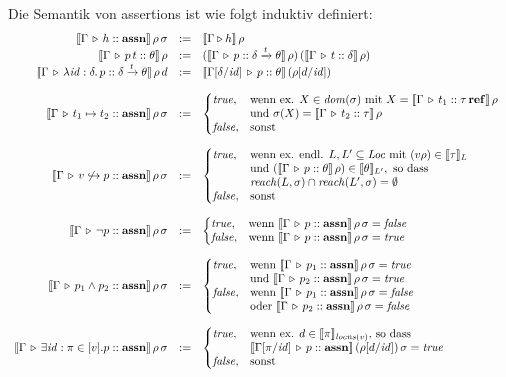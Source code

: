 \documentclass[12pt,a4paper,bigheadings]{scrartcl}
\newcommand{\semantic}[1]{\ensuremath{\llbracket#1\rrbracket}}
\newcommand{\assn}{\ensuremath{\mathbf{assn}}}
\newcommand{\locns}{\name{locns}}
\newcommand{\reach}{\name{reach}}
\newcommand{\tto}{\ensuremath{\xrightarrow{t}}}
\renewcommand{\disjoint}[2]{\ensuremath{#2\not\hookrightarrow#1}}
\begin{document}
\pagebreak[3] \noindent
Die Semantik von assertions ist wie folgt induktiv definiert:
\[\begin{array}{rcl}
  \semantic{\Tj{\Gamma}{h}{\assn}}\,\rho\,\sigma
  & := &
  \semantic{\Tjh{\Gamma}{h}}\,\rho
  \\
  \semantic{\Tj{\Gamma}{\app{p}{t}}{\theta}}\,\rho
  & := &
  (\semantic{\Tj{\Gamma}{p}{\delta \tto \theta}}\,\rho)\,(\semantic{\Tj{\Gamma}{t}{\delta}}\,\rho)
  \\
  \semantic{\Tj{\Gamma}{\abstr{\id:\delta}{p}}{\delta \tto \theta}}\,\rho\,d
  & := &
  \semantic{\Tj{\Gamma[\delta/\id]}{p}{\theta}}\,(\rho[d/\id])
  \\
  \\
  \semantic{\Tj{\Gamma}{t_1\mapsto t_2}{\assn}}\,\rho\,\sigma
  & := &
    \bcase
      \true, & \text{wenn ex. $X\in\dom{\sigma}$ mit } X = \semantic{\Tj{\Gamma}{t_1}{\reftype{\tau}}}\,\rho \\
             & \text{und } \sigma(X) = \semantic{\Tj{\Gamma}{t_2}{\tau}}\,\rho \\
      \false, & \text{sonst}
    \ecase
  \\
  \\
  \semantic{\Tj{\Gamma}{\disjoint{p}{v}}{\assn}}\,\rho\,\sigma
  & := &
    \bcase
      \true, & \text{wenn ex. endl. $L,L'\subseteq\Loc$ mit } (v\rho)\in\semantic{\tau}_{L} \\
             & \text{und } (\semantic{\Tj{\Gamma}{p}{\theta}}\,\rho)\in\semantic{\theta}_{L'}, \text{ so dass } \\
             & \reach(L,\sigma) \cap \reach(L',\sigma) = \emptyset \\
      \false, & \text{sonst}
    \ecase
  \\
  \\
  \semantic{\Tj{\Gamma}{\neg p}{\assn}}\,\rho\,\sigma
  & := &
    \bcase
      \true, & \text{wenn } \semantic{\Tj{\Gamma}{p}{\assn}}\,\rho\,\sigma = \false \\
      \false, & \text{wenn } \semantic{\Tj{\Gamma}{p}{\assn}}\,\rho\,\sigma = \true
    \ecase
  \\
  \\
  \semantic{\Tj{\Gamma}{p_1 \wedge p_2}{\assn}}\,\rho\,\sigma
  & := &
    \bcase
      \true, & \text{wenn } \semantic{\Tj{\Gamma}{p_1}{\assn}}\,\rho\,\sigma = \true \\
             & \text{und } \semantic{\Tj{\Gamma}{p_2}{\assn}}\,\rho\,\sigma = \true \\
      \false, & \text{wenn } \semantic{\Tj{\Gamma}{p_1}{\assn}}\,\rho\,\sigma = \false \\
             & \text{oder } \semantic{\Tj{\Gamma}{p_2}{\assn}}\,\rho\,\sigma = \false
    \ecase
  \\
  \\
  \semantic{\Tj{\Gamma}{\exists \id:\pi \in [v].p}{\assn}}\,\rho\,\sigma
  & := &
    \bcase
      \true, & \text{wenn ex. $d\in\semantic{\pi}_{\locns(v)}$, so dass} \\
             & \semantic{\Tj{\Gamma[\pi/\id]}{p}{\assn}}\,(\rho[d/\id])\,\sigma = \true \\
      \false, & \text{sonst}
    \ecase
\end{array}\]
\end{document}
